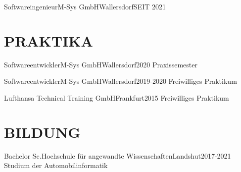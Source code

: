 \documentclass[10pt, a4paper]{article}
\begin{document}

\begin{cvitem}{Softwareingenieur}{M-Sys GmbH}{Wallersdorf}{SEIT 2021}
\end{cvitem}

\section{PRAKTIKA}

\begin{cvitem}{Softwareentwickler}{M-Sys GmbH}{Wallersdorf}{2020}
    Praxissemester
\end{cvitem}

\begin{cvitem}{Softwareentwickler}{M-Sys GmbH}{Wallersdorf}{2019-2020}
    Freiwilliges Praktikum
\end{cvitem}

\begin{cvitem}{}{Lufthansa Technical Training GmbH}{Frankfurt}{2015}
    Freiwilliges Praktikum
\end{cvitem}

\section{BILDUNG}


\begin{cvitem}{Bachelor Sc.}{Hochschule für angewandte Wissenschaften}{Landshut}{2017-2021}
    Studium der Automobilinformatik
\end{cvitem}
\end{document}
